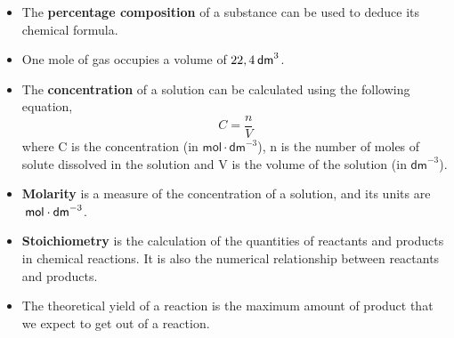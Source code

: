 \begin{itemize}[noitemsep]
\label{m38712*uid116}\item The \textbf{percentage composition} of a substance can be used to deduce its chemical formula.
\label{m38712*uid117}\item One mole of gas occupies a volume of $22,4\phantom{\rule{2pt}{0ex}}{\mathsf{dm}}^{3}$.
\label{m38712*uid118}\item The \textbf{concentration} of a solution can be calculated using the following equation,
\label{m38712*id286019}\nopagebreak\noindent{}
    \begin{equation*}
    C=\frac{n}{V}
      \end{equation*}
where C is the concentration (in $\mathsf{mol}\ensuremath{\cdot}{\mathsf{dm}}^{-3}$), n is the number of moles of solute dissolved in the solution and V is the volume of the solution (in ${\mathsf{dm}}^{-3}$).
\label{m38712*uid119}\item \textbf{Molarity} is a measure of the concentration of a solution, and its units are $\phantom{\rule{2pt}{0ex}}\mathsf{mol}\ensuremath{\cdot}{\mathsf{dm}}^{-3}$.
\label{m38712*uid120}\item \textbf{Stoichiometry} is the calculation of the quantities of reactants and products in chemical reactions. It is also the numerical relationship between reactants and products.
\item The theoretical yield of a reaction is the maximum amount of product that we expect to get out of a reaction.\end{itemize}
\label{m38712*secfhsst!!!underscore!!!id2334}

